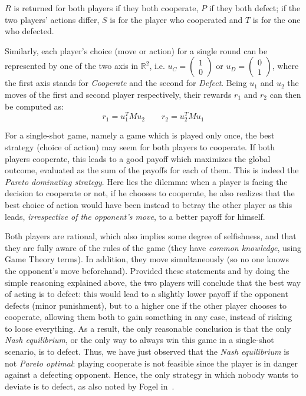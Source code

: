 \documentclass[journal,10pt,twoside]{IEEEtran}
\begin{document}
$R$ is returned for both players if they both cooperate, $P$ if they both defect; if the two players' actions differ, $S$ is for the player who cooperated and $T$ is for the one who defected.

Similarly, each player's choice (move or action) for a single round can be represented by one of the two axis in $\mathbb{R}^2$, i.e. $u_C=\begin{pmatrix} 1 \\ 0 \end{pmatrix}$ or $u_D=\begin{pmatrix} 0 \\ 1 \end{pmatrix}$, where the first axis stands for \textit{Cooperate} and the second for \textit{Defect}. Being $u_1$ and $u_2$ the moves of the first and second player respectively, their rewards $r_1$ and $r_2$ can then be computed as:
$$
r_1 = u_1^T M u_2
\quad
\quad
r_2 = u_2^T M u_1
$$

For a single-shot game, namely a game which is played only once, the best strategy (choice of action) may seem for both players to cooperate. If both players cooperate, this leads to a good payoff which maximizes the global outcome, evaluated as the sum of the payoffs for each of them. This is indeed the \textit{Pareto dominating strategy}. Here lies the dilemma: when a player is facing the decision to cooperate or not, if he chooses to cooperate, he also realizes that the best choice of action would have been instead to betray the other player as this leads, \textit{irrespective of the opponent's move}, to a better payoff for himself.

Both players are rational, which also implies some degree of selfishness, and that they are fully aware of the rules of the game (they have \textit{common knowledge}, using Game Theory terms). In addition, they move simultaneously (so no one knows the opponent's move beforehand). Provided these statements and by doing the simple reasoning explained above, the two players will conclude that the best way of acting is to defect: this would lead to a slightly lower payoff if the opponent defects (minor punishment), but to a higher one if the other player chooses to cooperate, allowing them both to gain something in any case, instead of risking to loose everything. As a result, the only reasonable conclusion is that the only \textit{Nash equilibrium}, or the only way to always win this game in a single-shot scenario, is to defect. Thus, we have just observed that the \textit{Nash equilibrium} is not \textit{Pareto optimal}: playing cooperate is not feasible since the player is in danger against a defecting opponent. Hence, the only strategy in which nobody wants to deviate is to defect, as also noted by Fogel in~\cite{fogelEvolvingBehaviors}.
\end{document}

